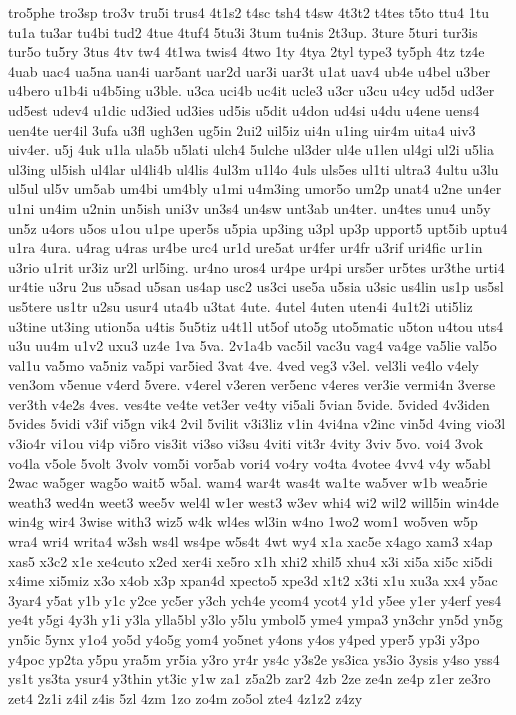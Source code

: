 {tro5phe 
tro3sp 
tro3v 
tru5i 
trus4 
4t1s2 
t4sc 
tsh4 
t4sw 
4t3t2 
t4tes 
t5to 
ttu4 
1tu 
tu1a 
tu3ar 
tu4bi 
tud2 
4tue 
4tuf4 
5tu3i 
3tum 
tu4nis 
2t3up. 
3ture 
5turi 
tur3is 
tur5o 
tu5ry 
3tus 
4tv 
tw4 
4t1wa 
twis4 
4two 
1ty 
4tya 
2tyl 
type3 
ty5ph 
4tz 
tz4e 
4uab 
uac4 
ua5na 
uan4i 
uar5ant 
uar2d 
uar3i 
uar3t 
u1at 
uav4 
ub4e 
u4bel 
u3ber 
u4bero 
u1b4i 
u4b5ing 
u3ble. 
u3ca 
uci4b 
uc4it 
ucle3 
u3cr 
u3cu 
u4cy 
ud5d 
ud3er 
ud5est 
udev4 
u1dic 
ud3ied 
ud3ies 
ud5is 
u5dit 
u4don 
ud4si 
u4du 
u4ene 
uens4 
uen4te 
uer4il 
3ufa 
u3fl 
ugh3en 
ug5in 
2ui2 
uil5iz 
ui4n 
u1ing 
uir4m 
uita4 
uiv3 
uiv4er. 
u5j 
4uk 
u1la 
ula5b 
u5lati 
ulch4 
5ulche 
ul3der 
ul4e 
u1len 
ul4gi 
ul2i 
u5lia 
ul3ing 
ul5ish 
ul4lar 
ul4li4b 
ul4lis 
4ul3m 
u1l4o 
4uls 
uls5es 
ul1ti 
ultra3 
4ultu 
u3lu 
ul5ul 
ul5v 
um5ab 
um4bi 
um4bly 
u1mi 
u4m3ing 
umor5o 
um2p 
unat4 
u2ne 
un4er 
u1ni 
un4im 
u2nin 
un5ish 
uni3v 
un3s4 
un4sw 
unt3ab 
un4ter. 
un4tes 
unu4 
un5y 
un5z 
u4ors 
u5os 
u1ou 
u1pe 
uper5s 
u5pia 
up3ing 
u3pl 
up3p 
upport5 
upt5ib 
uptu4 
u1ra 
4ura. 
u4rag 
u4ras 
ur4be 
urc4 
ur1d 
ure5at 
ur4fer 
ur4fr 
u3rif 
uri4fic 
ur1in 
u3rio 
u1rit 
ur3iz 
ur2l 
url5ing. 
ur4no 
uros4 
ur4pe 
ur4pi 
urs5er 
ur5tes 
ur3the 
urti4 
ur4tie 
u3ru 
2us 
u5sad 
u5san 
us4ap 
usc2 
us3ci 
use5a 
u5sia 
u3sic 
us4lin 
us1p 
us5sl 
us5tere 
us1tr 
u2su 
usur4 
uta4b 
u3tat 
4ute. 
4utel 
4uten 
uten4i 
4u1t2i 
uti5liz 
u3tine 
ut3ing 
ution5a 
u4tis 
5u5tiz 
u4t1l 
ut5of 
uto5g 
uto5matic 
u5ton 
u4tou 
uts4 
u3u 
uu4m 
u1v2 
uxu3 
uz4e 
1va 
5va. 
2v1a4b 
vac5il 
vac3u 
vag4 
va4ge 
va5lie 
val5o 
val1u 
va5mo 
va5niz 
va5pi 
var5ied 
3vat 
4ve. 
4ved 
veg3 
v3el. 
vel3li 
ve4lo 
v4ely 
ven3om 
v5enue 
v4erd 
5vere. 
v4erel 
v3eren 
ver5enc 
v4eres 
ver3ie 
vermi4n 
3verse 
ver3th 
v4e2s 
4ves. 
ves4te 
ve4te 
vet3er 
ve4ty 
vi5ali 
5vian 
5vide. 
5vided 
4v3iden 
5vides 
5vidi 
v3if 
vi5gn 
vik4 
2vil 
5vilit 
v3i3liz 
v1in 
4vi4na 
v2inc 
vin5d 
4ving 
vio3l 
v3io4r 
vi1ou 
vi4p 
vi5ro 
vis3it 
vi3so 
vi3su 
4viti 
vit3r 
4vity 
3viv 
5vo. 
voi4 
3vok 
vo4la 
v5ole 
5volt 
3volv 
vom5i 
vor5ab 
vori4 
vo4ry 
vo4ta 
4votee 
4vv4 
v4y 
w5abl 
2wac 
wa5ger 
wag5o 
wait5 
w5al. 
wam4 
war4t 
was4t 
wa1te 
wa5ver 
w1b 
wea5rie 
weath3 
wed4n 
weet3 
wee5v 
wel4l 
w1er 
west3 
w3ev 
whi4 
wi2 
wil2 
will5in 
win4de 
win4g 
wir4 
3wise 
with3 
wiz5 
w4k 
wl4es 
wl3in 
w4no 
1wo2 
wom1 
wo5ven 
w5p 
wra4 
wri4 
writa4 
w3sh 
ws4l 
ws4pe 
w5s4t 
4wt 
wy4 
x1a 
xac5e 
x4ago 
xam3 
x4ap 
xas5 
x3c2 
x1e 
xe4cuto 
x2ed 
xer4i 
xe5ro 
x1h 
xhi2 
xhil5 
xhu4 
x3i 
xi5a 
xi5c 
xi5di 
x4ime 
xi5miz 
x3o 
x4ob 
x3p 
xpan4d 
xpecto5 
xpe3d 
x1t2 
x3ti 
x1u 
xu3a 
xx4 
y5ac 
3yar4 
y5at 
y1b 
y1c 
y2ce 
yc5er 
y3ch 
ych4e 
ycom4 
ycot4 
y1d 
y5ee 
y1er 
y4erf 
yes4 
ye4t 
y5gi 
4y3h 
y1i 
y3la 
ylla5bl 
y3lo 
y5lu 
ymbol5 
yme4 
ympa3 
yn3chr 
yn5d 
yn5g 
yn5ic 
5ynx 
y1o4 
yo5d 
y4o5g 
yom4 
yo5net 
y4ons 
y4os 
y4ped 
yper5 
yp3i 
y3po 
y4poc 
yp2ta 
y5pu 
yra5m 
yr5ia 
y3ro 
yr4r 
ys4c 
y3s2e 
ys3ica 
ys3io 
3ysis 
y4so 
yss4 
ys1t 
ys3ta 
ysur4 
y3thin 
yt3ic 
y1w 
za1 
z5a2b 
zar2 
4zb 
2ze 
ze4n 
ze4p 
z1er 
ze3ro 
zet4 
2z1i 
z4il 
z4is 
5zl 
4zm 
1zo 
zo4m 
zo5ol 
zte4 
4z1z2 
z4zy 
} 
